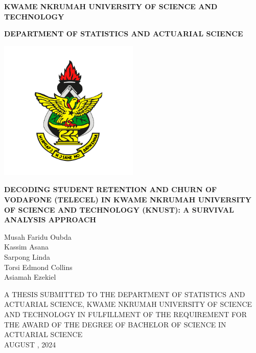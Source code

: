 \documentclass[doublespacing,12pt]{report}
\begin{document}
\begin{singlespace} %
\begin{titlepage}
\centering
    \large\textbf{KWAME NKRUMAH UNIVERSITY OF SCIENCE AND TECHNOLOGY}

      \vspace{0.2cm}
  \large\textbf{DEPARTMENT OF STATISTICS AND ACTUARIAL SCIENCE}
    
     \begin{center}
\includegraphics[width=0.5\textwidth]{logo.png}\end{center}

   \large{\textbf{\MakeUppercase{Decoding Student Retention and Churn of Vodafone (Telecel) in Kwame Nkrumah University of Science and Technology (KNUST): A Survival Analysis Approach}}}
\vspace{0.4cm}
   \\
    \vspace{0.4cm}
    
\large{Musah Faridu Oubda\\
Kassim Asana\\
Sarpong Linda\\
Torsi Edmond Collins\\
Asiamah Ezekiel}

    \vspace{0.4cm}  
    \small{A THESIS SUBMITTED TO THE DEPARTMENT OF STATISTICS AND ACTUARIAL SCIENCE, KWAME NKRUMAH UNIVERSITY OF SCIENCE AND TECHNOLOGY IN FULFILLMENT OF THE REQUIREMENT FOR THE AWARD OF THE DEGREE OF BACHELOR OF SCIENCE IN ACTUARIAL SCIENCE}\\
    \vspace{0.4cm}
    {AUGUST , 2024}
\end{titlepage}
\end{singlespace} %
\end{document}
